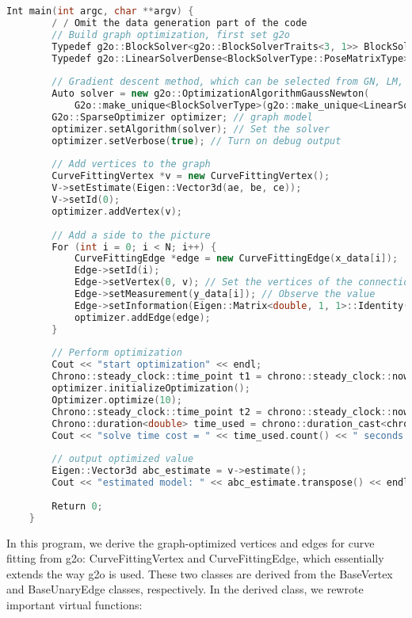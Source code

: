 \begin{lstlisting}[language=c++,caption=slambook/ch6/g2oCurveFitting.cpp]
    Int main(int argc, char **argv) {
        / / Omit the data generation part of the code
        // Build graph optimization, first set g2o
        Typedef g2o::BlockSolver<g2o::BlockSolverTraits<3, 1>> BlockSolverType; // Each error term has an optimized variable dimension of 3 and an error value dimension of 1
        Typedef g2o::LinearSolverDense<BlockSolverType::PoseMatrixType> LinearSolverType; // Linear solver type
        
        // Gradient descent method, which can be selected from GN, LM, DogLeg
        Auto solver = new g2o::OptimizationAlgorithmGaussNewton(
            G2o::make_unique<BlockSolverType>(g2o::make_unique<LinearSolverType>()));
        G2o::SparseOptimizer optimizer; // graph model
        optimizer.setAlgorithm(solver); // Set the solver
        optimizer.setVerbose(true); // Turn on debug output
        
        // Add vertices to the graph
        CurveFittingVertex *v = new CurveFittingVertex();
        V->setEstimate(Eigen::Vector3d(ae, be, ce));
        V->setId(0);
        optimizer.addVertex(v);
        
        // Add a side to the picture
        For (int i = 0; i < N; i++) {
            CurveFittingEdge *edge = new CurveFittingEdge(x_data[i]);
            Edge->setId(i);
            Edge->setVertex(0, v); // Set the vertices of the connection
            Edge->setMeasurement(y_data[i]); // Observe the value
            Edge->setInformation(Eigen::Matrix<double, 1, 1>::Identity() * 1 / (w_sigma * w_sigma)); // Information matrix: the inverse of the covariance matrix
            optimizer.addEdge(edge);
        }
        
        // Perform optimization
        Cout << "start optimization" << endl;
        Chrono::steady_clock::time_point t1 = chrono::steady_clock::now();
        optimizer.initializeOptimization();
        Optimizer.optimize(10);
        Chrono::steady_clock::time_point t2 = chrono::steady_clock::now();
        Chrono::duration<double> time_used = chrono::duration_cast<chrono::duration<double>>(t2 - t1);
        Cout << "solve time cost = " << time_used.count() << " seconds. " << endl;
        
        // output optimized value
        Eigen::Vector3d abc_estimate = v->estimate();
        Cout << "estimated model: " << abc_estimate.transpose() << endl;
        
        Return 0;
    }
\end{lstlisting}

In this program, we derive the graph-optimized vertices and edges for curve fitting from g2o: CurveFittingVertex and CurveFittingEdge, which essentially extends the way g2o is used. These two classes are derived from the BaseVertex and BaseUnaryEdge classes, respectively. In the derived class, we rewrote important virtual functions:

